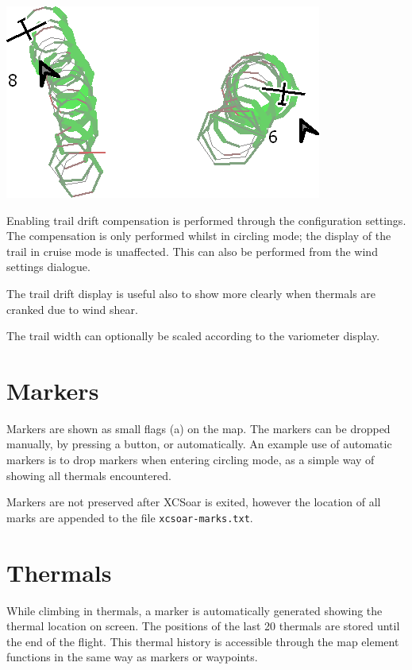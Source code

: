 \begin{center}
\includegraphics[angle=0,width=0.6\linewidth,keepaspectratio='true']{figures/traildrift.png}
\end{center}

Enabling trail drift compensation is performed through the
configuration settings.  The compensation is only performed
whilst in circling mode; the display of the trail in cruise mode is unaffected.
This can also be performed from the wind settings dialogue.

The trail drift display is useful also to show more clearly when thermals
are cranked due to wind shear.

The trail width can optionally be scaled according to the variometer display.


\section{Markers}\label{sec:markers}

Markers are shown as small flags (a) on the map.  The markers can be dropped
manually, by pressing a button, or automatically.  An example use of
automatic markers is to drop markers when entering circling mode, as a
simple way of showing all thermals encountered.

Markers are not preserved after XCSoar is exited, however the location
of all marks are appended to the file \verb|xcsoar-marks.txt|.

\section{Thermals}

While climbing in thermals, a marker is automatically generated showing the
thermal location on screen.    The positions of the last 20 thermals are
stored until the end of the flight.
This thermal history is accessible through the map
element functions in the same way as markers or waypoints.


